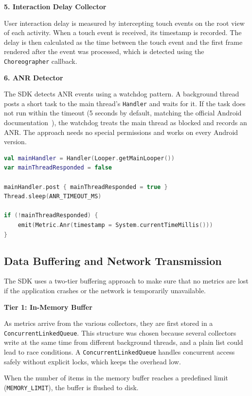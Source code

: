 \textbf{5. Interaction Delay Collector}

User interaction delay is measured by intercepting touch events on the root view of each activity. When a touch event is received, its timestamp is recorded. The delay is then calculated as the time between the touch event and the first frame rendered after the event was processed, which is detected using the \texttt{Choreographer} callback.

\textbf{6. ANR Detector}

The SDK detects ANR events using a watchdog pattern. A background thread posts a short task to the main thread's \texttt{Handler} and waits for it. If the task does not run within the timeout (5 seconds by default, matching the official Android documentation~\cite{AndroidVitals}), the watchdog treats the main thread as blocked and records an ANR. The approach needs no special permissions and works on every Android version.

\begin{lstlisting}[language=Kotlin, caption={ANR Watchdog: detection logic}]
val mainHandler = Handler(Looper.getMainLooper())
var mainThreadResponded = false

mainHandler.post { mainThreadResponded = true }
Thread.sleep(ANR_TIMEOUT_MS)

if (!mainThreadResponded) {
    emit(Metric.Anr(timestamp = System.currentTimeMillis()))
}
\end{lstlisting}

\subsection{Data Buffering and Network Transmission}

The SDK uses a two-tier buffering approach to make sure that no metrics are lost if the application crashes or the network is temporarily unavailable.

\textbf{Tier 1: In-Memory Buffer}

As metrics arrive from the various collectors, they are first stored in a \texttt{ConcurrentLinkedQueue}. This structure was chosen because several collectors write at the same time from different background threads, and a plain list could lead to race conditions. A \texttt{ConcurrentLinkedQueue} handles concurrent access safely without explicit locks, which keeps the overhead low.

When the number of items in the memory buffer reaches a predefined limit (\texttt{MEMORY\_LIMIT}), the buffer is flushed to disk.

